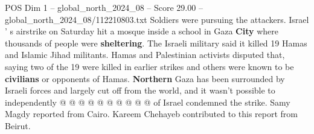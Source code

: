 \begin{textsample}{POS Dim 1 – global\_north\_2024\_08 – Score 29.00 – global\_north\_2024\_08/112210803.txt}
Soldiers were pursuing the attackers.
Israel ' s airstrike on Saturday hit a mosque inside a school in Gaza \textbf{City} where thousands of people were \textbf{sheltering}.
The Israeli military said it killed 19 Hamas and Islamic Jihad militants.
Hamas and Palestinian activists disputed that, saying two of the 19 were killed in earlier strikes and others were known to be \textbf{civilians} or opponents of Hamas. \textbf{Northern} Gaza has been surrounded by Israeli forces and largely cut off from the world, and it wasn't possible to independently @ @ @ @ @ @ @ @ @ @ of Israel condemned the strike.
Samy Magdy reported from Cairo.
Kareem Chehayeb contributed to this report from Beirut.

\end{textsample}
